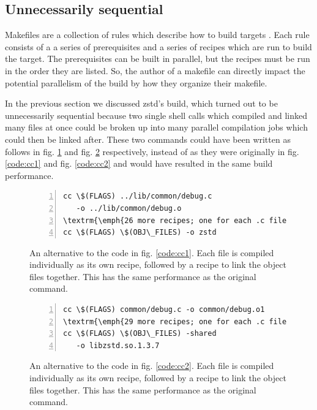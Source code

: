 \documentclass[sigconf,10pt,review,authorversion]{acmart}\settopmatter{printfolios=true,printccs=false,printacmref=false}
\begin{document}
\subsection{Unnecessarily sequential}
\label{sec:sequential}

Makefiles are a collection of rules which describe how to build targets \cite{gnumakemanual}.
Each rule consists
of a a series of prerequisites and a series of recipes which are run to build the target.  The
prerequisites can be built in parallel, but the recipes must be run in the order they are listed.  So,
the author of a makefile can directly impact the potential parallelism of the build by
how they organize their makefile.

In the previous section we discussed zstd's build, which turned out to be unnecessarily sequential
because two single shell calls which compiled and linked many files at once could be broken up
into many parallel compilation jobs which could then be linked after.  These two commands could
have been written as follows in fig. \ref{code:cc5} and fig. \ref{code:cc6} respectively, instead of as they were
originally in fig. \ref{code:cc1} and fig. \ref{code:cc2} and would have resulted in the same
build performance.

\begin{figure}[H]
  \begin{Verbatim}[commandchars=\\\{\},codes={\catcode`$=3\catcode`^=7\catcode`_=8},fontsize=\small,numbers=left,xleftmargin=5mm]
cc \$(FLAGS) ../lib/common/debug.c
   -o ../lib/common/debug.o
\textrm{\emph{26 more recipes; one for each .c file that needs to be compiled}}
cc \$(FLAGS) \$(OBJ\_FILES) -o zstd
\end{Verbatim}
  \caption{An alternative to the code in fig. \ref{code:cc1}. Each file is compiled individually
    as its own recipe, followed by a recipe to link the object files together.  This has the same
    performance as the original command.}
\label{code:cc5}
\end{figure}

\begin{figure}[H]
  \begin{Verbatim}[commandchars=\\\{\},codes={\catcode`$=3\catcode`^=7\catcode`_=8},fontsize=\small,numbers=left,xleftmargin=5mm]
cc \$(FLAGS) common/debug.c -o common/debug.o1
\textrm{\emph{29 more recipes; one for each .c file that needs to be compiled}}
cc \$(FLAGS) \$(OBJ\_FILES) -shared
   -o libzstd.so.1.3.7
\end{Verbatim}
  \caption{An alternative to the code in fig. \ref{code:cc2}. Each file is compiled individually
    as its own recipe, followed by a recipe to link the object files together.  This has the same
    performance as the original command.}
\label{code:cc6}
\end{figure}
\end{document}
